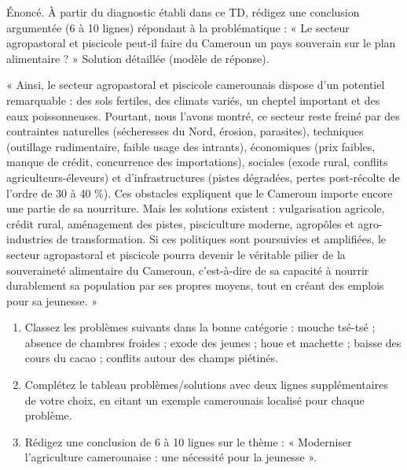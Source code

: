 \documentclass[11pt]{article}
\newcommand{\cle}[1]{{\popxbold\color{popdark}#1}}
\begin{document}
\begin{exoresolu}
Énoncé. À partir du diagnostic établi dans ce TD, rédigez une conclusion argumentée (6 à 10 lignes) répondant à la problématique : « Le secteur agropastoral et piscicole peut-il faire du Cameroun un pays souverain sur le plan alimentaire ? »
\tcblower
Solution détaillée (modèle de réponse). \par
« Ainsi, le secteur agropastoral et piscicole camerounais dispose d'un potentiel remarquable : des sols fertiles, des climats variés, un cheptel important et des eaux poissonneuses. Pourtant, nous l'avons montré, ce secteur reste freiné par des contraintes naturelles (sécheresses du Nord, érosion, parasites), techniques (outillage rudimentaire, faible usage des intrants), économiques (prix faibles, manque de crédit, concurrence des importations), sociales (exode rural, conflits agriculteurs-éleveurs) et d'infrastructures (pistes dégradées, pertes post-récolte de l'ordre de 30 à 40 \%). Ces obstacles expliquent que le Cameroun importe encore une partie de sa nourriture. Mais les solutions existent : vulgarisation agricole, crédit rural, aménagement des pistes, pisciculture moderne, agropôles et agro-industries de transformation. Si ces politiques sont poursuivies et amplifiées, le secteur agropastoral et piscicole pourra devenir le véritable pilier de la \cle{souveraineté alimentaire} du Cameroun, c'est-à-dire de sa capacité à nourrir durablement sa population par ses propres moyens, tout en créant des emplois pour sa jeunesse. »
\end{exoresolu}

\begin{exercice}
\begin{enumerate}
\item Classez les problèmes suivants dans la bonne catégorie : mouche tsé-tsé ; absence de chambres froides ; exode des jeunes ; houe et machette ; baisse des cours du cacao ; conflits autour des champs piétinés.
\item Complétez le tableau problèmes/solutions avec deux lignes supplémentaires de votre choix, en citant un exemple camerounais localisé pour chaque problème.
\item Rédigez une conclusion de 6 à 10 lignes sur le thème : « Moderniser l'agriculture camerounaise : une nécessité pour la jeunesse ».
\end{enumerate}
\end{exercice}
\end{document}
